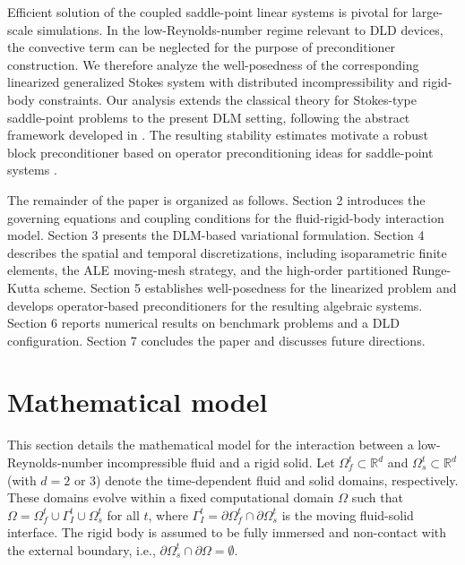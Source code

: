 \documentclass{article}
\begin{document}
Efficient solution of the coupled saddle-point linear systems is pivotal for large-scale simulations. In the low-Reynolds-number regime relevant to DLD devices, the convective term can be neglected for the purpose of preconditioner construction. We therefore analyze the well-posedness of the corresponding linearized generalized Stokes system with distributed incompressibility and rigid-body constraints. Our analysis extends the classical theory for Stokes-type saddle-point problems \cite{bramble1997iterative} to the present DLM setting, following the abstract framework developed in \cite{boffi2021existence,boffi2022existence}. The resulting stability estimates motivate a robust block preconditioner based on operator preconditioning ideas for saddle-point systems \cite{loghin2004analysis,Wathen_2015,Benzi_Golub_Liesen_2005,mardal2011preconditioning}.

The remainder of the paper is organized as follows. Section 2 introduces the governing equations and coupling conditions for the fluid-rigid-body interaction model. Section 3 presents the DLM-based variational formulation. Section 4 describes the spatial and temporal discretizations, including isoparametric finite elements, the ALE moving-mesh strategy, and the high-order partitioned Runge-Kutta scheme. Section 5 establishes well-posedness for the linearized problem and develops operator-based preconditioners for the resulting algebraic systems. Section 6 reports numerical results on benchmark problems and a DLD configuration. Section 7 concludes the paper and discusses future directions.


\section{Mathematical model}

This section details the mathematical model for the interaction between a low-Reynolds-number incompressible fluid and a rigid solid. Let $\Omega_f^t \subset \mathbb{R}^d$ and $\Omega_s^t \subset \mathbb{R}^d$ (with $d = 2$ or $3$) denote the time-dependent fluid and solid domains, respectively. These domains evolve within a fixed computational domain $\Omega$ such that $\Omega = \Omega_f^t \cup \Gamma_I^t \cup \Omega_s^t$ for all $t$, where $\Gamma_I^t = \partial \Omega_f^t \cap \partial \Omega_s^t$ is the moving fluid-solid interface. The rigid body is assumed to be fully immersed and non-contact with the external boundary, i.e., $\partial\Omega_s^t \cap \partial \Omega = \emptyset$.
\end{document}

